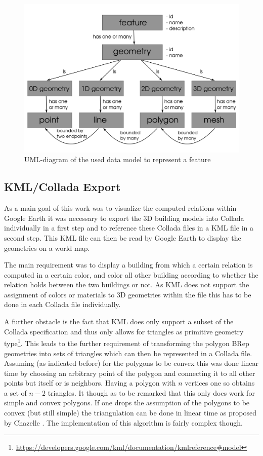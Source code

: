 \documentclass[paper=a4, fontsize=11pt]{scrartcl} %
\numberwithin{equation}{section} %
\numberwithin{figure}{section} %
\numberwithin{table}{section} %
\begin{document}
\begin{figure}[h]
  \centering
  \includegraphics[width=34em]{img/uml}
  \caption{UML-diagram of the used data model to represent a feature}
  \label{fig:uml}
\end{figure}

\subsection{KML/Collada Export}\label{sec:kmlcollada-export}
As a main goal of this work was to visualize the computed relations within Google Earth it was necessary to export the 3D building models into Collada individually in a first step and to reference these Collada files in a KML file in a second step. This KML file can then be read by Google Earth to display the geometries on a world map.

The main requirement was to display a building from which a certain relation is computed in a certain color, and color all other building according to whether the relation holds between the two buildings or not. As KML does not support the assignment of colors or materials to 3D geometries within the file this has to be done in each Collada file individually. 

A further obstacle is the fact that KML does only support a subset of the Collada specification and thus only allows for triangles as primitive geometry type\footnote{\url{https://developers.google.com/kml/documentation/kmlreference#model} }. This leads to the further requirement of transforming the polygon BRep geometries into sets of triangles which can then be represented in a Collada file. Assuming (as indicated before) for the polygons to be convex this was done linear time by choosing an arbitrary point of the polygon and connecting it to all other points but itself or is neighbors. Having a polygon with $n$ vertices one so obtains a set of $n-2$ triangles. It though as to be remarked that this only does work for simple and convex polygons. If one drops the assumption of the polygons to be convex (but still simple) the triangulation  can be done in linear time as proposed by Chazelle \cite{chazelle1991}. The implementation of this algorithm is fairly complex though.
\end{document}
